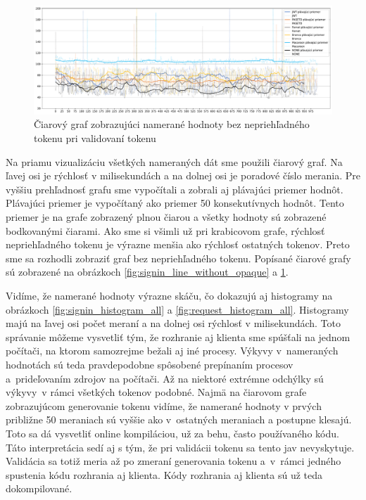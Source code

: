 \begin{figure}[H]
  \centerline{\includegraphics[width=1\textwidth]{images/request_line_without_opaque}}
  \caption[Čiarový graf -- validácia, hodnoty bez nepriehľadného tokenu]{Čiarový graf zobrazujúci namerané hodnoty bez nepriehľadného tokenu pri validovaní tokenu}
  \label{fig:request_line_without_opaque}
\end{figure}

Na priamu vizualizáciu všetkých nameraných dát sme použili čiarový graf. Na ľavej osi je rýchlosť v milisekundách a na dolnej osi je poradové číslo merania. Pre vyššiu prehľadnosť grafu sme vypočítali a zobrali aj plávajúci priemer hodnôt. Plávajúci priemer je vypočítaný ako priemer 50 konsekutívnych hodnôt. Tento priemer je na grafe zobrazený plnou čiarou a všetky hodnoty sú zobrazené bodkovanými čiarami. Ako sme si všimli už pri krabicovom grafe, rýchlosť nepriehľadného tokenu je výrazne menšia ako rýchlosť ostatných tokenov. Preto sme sa rozhodli zobraziť graf bez nepriehľadného tokenu. Popísané čiarové grafy sú zobrazené na obrázkoch \ref{fig:signin_line_without_opaque} a \ref{fig:request_line_without_opaque}.


Vidíme, že namerané hodnoty výrazne skáču, čo dokazujú aj histogramy na obrázkoch \ref{fig:signin_histogram_all} a \ref{fig:request_histogram_all}. Histogramy majú na ľavej osi počet meraní a na dolnej osi rýchlosť v milisekundách. Toto správanie môžeme vysvetliť tým, že rozhranie aj klienta sme spúšťali na jednom počítači, na ktorom samozrejme bežali aj iné procesy. Výkyvy v~nameraných hodnotách sú teda pravdepodobne spôsobené prepínaním procesov a~prideľovaním zdrojov na počítači. Až na niektoré extrémne odchýlky sú výkyvy~v rámci všetkých tokenov podobné. Najmä na čiarovom grafe zobrazujúcom generovanie tokenu vidíme, že namerané hodnoty v prvých približne 50 meraniach sú vyššie ako v~ostatných meraniach a postupne klesajú. Toto sa dá vysvetliť online kompiláciou, už za behu, často používaného kódu. Táto interpretácia sedí aj s tým, že pri validácii tokenu sa tento jav nevyskytuje. Validácia sa totiž meria až po zmeraní generovania tokenu a~v~rámci jedného spustenia kódu rozhrania aj klienta. Kódy rozhrania aj klienta sú už teda dokompilované.


